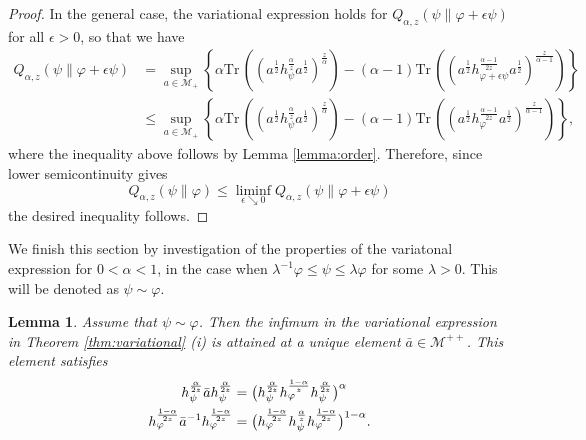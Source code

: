 \documentclass[12pt]{article}
\newtheorem{lemma}[theorem]{Lemma}
\theoremstyle{definition}
\theoremstyle{remark}
\numberwithin{equation}{section}
\def\Me{\mathcal M}
\def \Tr{\mathrm{Tr}\,}
\def\ffi{\varphi}
\begin{document}
\begin{proof}
In the general case,  the variational expression holds for
$Q_{\alpha,z}(\psi\|\varphi+\epsilon\psi)$  for all $\epsilon>0$, so that we have
\begin{align*}
Q_{\alpha,z}(\psi\|\varphi+\epsilon\psi)&=\sup_{a\in \Me_+} \left\{\alpha
\Tr\left((a^{\frac12}h_\psi^{\frac{\alpha}{z}}a^{\frac12})^{\frac{z}{\alpha}}\right)-(\alpha-1)
\Tr\left((a^{\frac12}h_{\varphi+\epsilon \psi}^{\frac{\alpha-1}{2z}}a^{\frac12})^{\frac{z}{\alpha-1}}\right) \right\}\\
&\le\sup_{a\in \Me_+} \left\{\alpha
\Tr\left((a^{\frac12}h_\psi^{\frac{\alpha}{z}}a^{\frac12})^{\frac{z}{\alpha}}\right)-(\alpha-1)
\Tr\left((a^{\frac12}h_\varphi^{\frac{\alpha-1}{2z}}a^{\frac12})^{\frac{z}{\alpha-1}}\right)
\right\},
\end{align*}
where the inequality above follows by Lemma \ref{lemma:order}. Therefore, since lower
semicontinuity  \cite[Theorem 2 (iv)]{kato2023onrenyi} gives
\[
Q_{\alpha,z}(\psi\|\varphi)\le \liminf_{\epsilon\searrow 0}
Q_{\alpha,z}(\psi\|\varphi+\epsilon \psi) 
\]
the desired inequality follows.

 
\end{proof}

We finish this section by investigation of the properties of the variatonal expression for
$0<\alpha<1$, in the case when $\lambda^{-1}\ffi\le \psi\le \lambda \ffi$ for some
$\lambda>0$. This will be denoted as $\psi\sim \ffi$. 


\begin{lemma}\label{lemma:variational_majorized}  Assume that $\psi\sim\ffi$. Then
the infimum in the variational expression in Theorem \ref{thm:variational} (i) is attained at a unique element  $\bar a\in \Me^{++}$. This element  satisfies
\begin{align}
h_\psi^{\alpha\over2z}\bar ah_\psi^{\alpha\over2z}
&=\bigl(h_\psi^{\alpha\over2z}h_\ffi^{1-\alpha\over z}h_\psi^{\alpha\over2z}\bigr)^\alpha
\label{eq:minimizer1}\\
h_\ffi^{1-\alpha\over2z}\bar a^{-1}h_\ffi^{1-\alpha\over2z}
&=\bigl(h_\ffi^{1-\alpha\over2z}h_\psi^{\alpha\over
z}h_\ffi^{1-\alpha\over2z}\bigr)^{1-\alpha}.
\label{eq:minimizer2}
\end{align}
\end{lemma}
\end{document}
